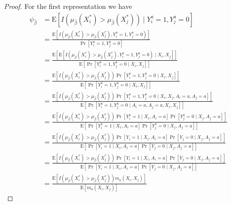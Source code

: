 \begin{proof}
    For the first representation we have 
$$
\begin{aligned}
 \psi_{\widehat{\beta}}&= \mathrm{E}\left[I\left(\mu_{\widehat{\beta}}(X_i^*)>\mu_{\widehat{\beta}}(X_j^*)\right) \mid Y^a_i=1, Y^a_j=0\right] \\
&= \frac{\mathrm{E}\left[I\left(\mu_{\widehat{\beta}}(X_i^*)>\mu_{\widehat{\beta}}(X_j^*), Y^a_i=1, Y^a_j=0\right)\right]}{\operatorname{Pr}\left[Y^a_i=1, Y^a_j=0\right]} \\
&= \frac{\mathrm{E}\left[\mathrm{E}\left[I\left(\mu_{\widehat{\beta}}(X_i^*)>\mu_{\widehat{\beta}}(X_j^*), Y^a_i=1, Y^a_j=0\right) \mid X_i, X_j\right]\right]}{\mathrm{E}\left[\operatorname{Pr}\left[Y^a_i=1, Y^a_j=0 \mid X_i, X_j\right]\right]} \\
&= \frac{\mathrm{E}\left[I\left(\mu_{\widehat{\beta}}(X_i^*)>\mu_{\widehat{\beta}}(X_j^*)\right) \operatorname{Pr}\left[Y^a_i=1, Y^a_j=0  \mid X_i, X_j\right]\right]}{\mathrm{E}\left[\operatorname{Pr}\left[Y^a_i=1, Y^a_j=0  \mid X_i, X_j\right]\right]} \\
&= \frac{\mathrm{E}\left[I\left(\mu_{\widehat{\beta}}(X_i^*)>\mu_{\widehat{\beta}}(X_j^*)\right) \operatorname{Pr}\left[Y^a_i=1, Y^a_j=0  \mid X_i, X_j, A_i = a, A_j = a\right]\right]}{\mathrm{E}\left[\operatorname{Pr}\left[Y^a_i=1, Y^a_j=0  \mid A_i = a, A_j = a, X_i, X_j\right]\right]} \\
&= \frac{\mathrm{E}\left[I\left(\mu_{\widehat{\beta}}(X_i^*)>\mu_{\widehat{\beta}}(X_j^*)\right) \operatorname{Pr}\left[Y^a_i=1 \mid X_i,A_i = a\right] \Pr\left[ Y^a_j=0 \mid X_j, A_j = a\right]\right]}{\mathrm{E}\left[\operatorname{Pr}\left[Y^a_i=1 \mid X_i,A_i = a\right] \Pr\left[ Y^a_j=0 \mid X_j, A_j = a\right]\right]} \\
&= \frac{\mathrm{E}\left[I\left(\mu_{\widehat{\beta}}(X_i^*)>\mu_{\widehat{\beta}}(X_j^*)\right) \operatorname{Pr}\left[Y_i=1 \mid X_i,A_i = a\right] \Pr\left[ Y_j=0 \mid X_j, A_j = a\right]\right]}{\mathrm{E}\left[\operatorname{Pr}\left[Y_i=1 \mid X_i,A_i = a\right] \Pr\left[ Y_j=0 \mid X_j, A_j = a\right]\right]} \\
&= \frac{\mathrm{E}\left[I\left(\mu_{\widehat{\beta}}(X_i^*)>\mu_{\widehat{\beta}}(X_j^*)\right) \operatorname{Pr}\left[Y_i=1 \mid X_i,A_i = a\right] \Pr\left[ Y_j=0 \mid X_j, A_j = a\right]\right]}{\mathrm{E}\left[\operatorname{Pr}\left[Y_i=1 \mid X_i,A_i = a\right] \Pr\left[ Y_j=0 \mid X_j, A_j = a\right]\right]} \\
&= \frac{\mathrm{E}\left[I\left(\mu_{\widehat{\beta}}(X_i^*)>\mu_{\widehat{\beta}}(X_j^*)\right)m_a(X_i, X_j) \right]}{\mathrm{E}\left[m_a(X_i, X_j) \right]}
\end{aligned}
$$


\end{proof}
